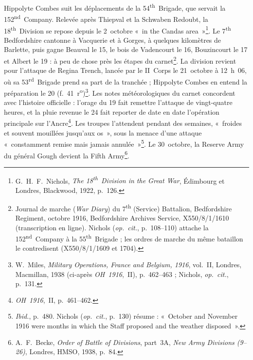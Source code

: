Hippolyte Combes suit les déplacements de la 54\textsuperscript{th}~Brigade, que servait la 152\textsuperscript{nd}~Company. Relevée après Thiepval et la Schwaben Redoubt, la 18\textsuperscript{th}~Division se repose depuis le 2~octobre «~in the Candas area~»\footnote{G.~H.~F.~Nichols, \textit{The 18\textsuperscript{th}~Division in the Great War}, Édimbourg et Londres, Blackwood, 1922, p.~126.}. Le 7\textsuperscript{th} Bedfordshire cantonne à Vacquerie et à Gorges, à quelques kilomètres de Barlette, puis gagne Beauval le 15, le bois de Vadencourt le 16, Bouzincourt le 17 et Albert le 19 : à peu de chose près les étapes du carnet\footnote{Journal de marche (\textit{War Diary}) du 7\textsuperscript{th} (Service) Battalion, Bedfordshire Regiment, octobre 1916, Bedfordshire Archives Service, X550/8/1/1610 (transcription en ligne). Nichols (\textit{op.~cit.}, p.~108--110) attache la 152\textsuperscript{nd}~Company à la 55\textsuperscript{th}~Brigade ; les ordres de marche du même bataillon le contredisent (X550/8/1/1609 et 1704).}. La division revient pour l'attaque de Regina Trench, lancée par le II~Corps le 21~octobre à 12~h~06, où sa 53\textsuperscript{rd}~Brigade prend sa part de la tranchée ; Hippolyte Combes en entend la préparation le 20 (f.~41~r\textsuperscript{o})\footnote{W.~Miles, \textit{Military Operations, France and Belgium, 1916}, vol.~II, Londres, Macmillan, 1938 (ci-après \textit{OH~1916},~II), p.~462--463 ; Nichols, \textit{op.~cit.}, p.~131.}. Les notes météorologiques du carnet concordent avec l'histoire officielle : l'orage du 19 fait remettre l'attaque de vingt-quatre heures, et la pluie revenue le 24 fait reporter de date en date l'opération principale sur l'Ancre\footnote{\textit{OH~1916},~II, p.~461--462.}. Les troupes l'attendent pendant des semaines, «~froides et souvent mouillées jusqu'aux os~», sous la menace d'une attaque «~constamment remise mais jamais annulée~»\footnote{\textit{Ibid.}, p.~480. Nichols (\textit{op.~cit.}, p.~130) résume : «~October and November 1916 were months in which the Staff proposed and the weather disposed~».}. Le 30~octobre, la Reserve Army du général Gough devient la Fifth Army\footnote{A.~F.~Becke, \textit{Order of Battle of Divisions}, part~3A, \textit{New Army Divisions (9--26)}, Londres, HMSO, 1938, p.~84.}.

